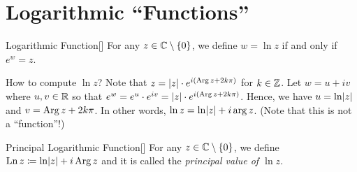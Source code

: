 \documentclass[../complex_variables_1.tex]{subfiles}
\begin{document}
\section{Logarithmic ``Functions''}

\begin{Definition}{Logarithmic Function}[]
    For any \(z \in \CC \setminus \{0\}\),
    we define \(w = \ln z\) if and only if \(e^w = z\).
\end{Definition}

\begin{note}
    How to compute \(\ln z\)?
    Note that \(z = \lvert z\rvert \cdot e^{i(\operatorname{Arg} z + 2k\pi)}\)
    for \(k \in \ZZ\).
    Let \(w = u + iv\) where \(u, v \in \RR\)
    so that \(e^w = e^u \cdot e^{iv} = \lvert z\rvert \cdot e^{i(\operatorname{Arg} z + 2k\pi)}\).
    Hence, we have \(u = \ln\lvert z\rvert\) and \(v = \operatorname{Arg} z + 2k\pi\).
    In other words, \(\ln z = \ln\lvert z\rvert + i\arg z\). (Note that this is not a ``function''!)
\end{note}


\begin{Definition}{Principal Logarithmic Function}[]
    For any \(z \in \CC \setminus \{0\}\),
    we define \(\operatorname{Ln} z \coloneqq \ln\lvert z\rvert + i \operatorname{Arg} z\)
    and it is called the \emph{principal value of \(\ln z\)}.
\end{Definition}
\end{document}
